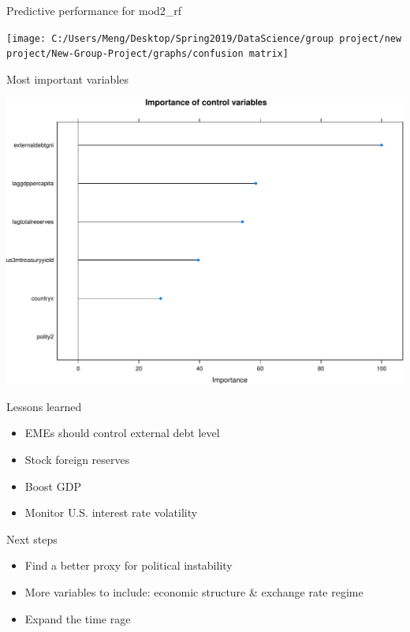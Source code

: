 \documentclass[ignorenonframetext,]{beamer}
\providecommand{\tightlist}{%
  \setlength{\itemsep}{0pt}\setlength{\parskip}{0pt}}
\begin{document}
\begin{frame}{Predictive performance for mod2\_rf}

\begin{center}\texttt{[image: C:/Users/Meng/Desktop/Spring2019/DataScience/group project/new project/New-Group-Project/graphs/confusion matrix]} \end{center}

\end{frame}

\begin{frame}{Most important variables}

\begin{center}\includegraphics{beamer-pre_files/figure-beamer/unnamed-chunk-57-1} \end{center}

\end{frame}

\begin{frame}{Lessons learned}

\begin{itemize}
\tightlist
\item
  EMEs should control external debt level
\item
  Stock foreign reserves
\item
  Boost GDP
\item
  Monitor U.S. interest rate volatility
\end{itemize}

\end{frame}

\begin{frame}{Next steps}

\begin{itemize}
\tightlist
\item
  Find a better proxy for political instability
\item
  More variables to include: economic structure \& exchange rate regime
\item
  Expand the time rage
\end{itemize}

\end{frame}
\end{document}
